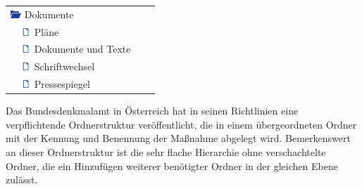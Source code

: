 \begin{center}
\begin{longtable}{l l l l}
		\multicolumn{2}{l}{\includegraphics[width=0.4cm]{bilder/OrdnerIconAuf.png} \hspace*{0.04cm} Dokumente}\\
	    & \includegraphics[width=0.4cm]{bilder/DateiIcon.png} \hspace*{0.04cm} Pläne\\
		& \includegraphics[width=0.4cm]{bilder/DateiIcon.png} \hspace*{0.04cm} Dokumente und Texte\\
		& \includegraphics[width=0.4cm]{bilder/DateiIcon.png} \hspace*{0.04cm} Schriftwechsel\\
		& \includegraphics[width=0.4cm]{bilder/DateiIcon.png} \hspace*{0.04cm} Pressespiegel\\
		\bottomrule
	\end{longtable}
\end{center}

Das Bundesdenkmalamt in Österreich hat in seinen Richtlinien eine verpflichtende Ordnerstruktur veröffentlicht, die in einem übergeordneten Ordner mit der Kennung und Benennung der Maßnahme abgelegt wird. Bemerkenswert an dieser Ordnerstruktur ist die sehr flache Hierarchie ohne verschachtelte Ordner, die ein Hinzufügen weiterer benötigter Ordner in der gleichen Ebene zulässt. 


